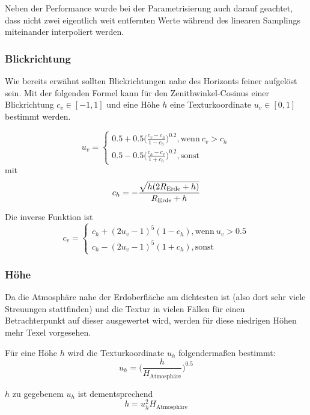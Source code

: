 Neben der Performance wurde bei der Parametrisierung auch darauf geachtet, dass nicht zwei eigentlich weit entfernten
Werte während des linearen Samplings miteinander interpoliert werden.

\subsubsection{Blickrichtung}
Wie bereits erwähnt sollten Blickrichtungen nahe des Horizonts feiner aufgelöst sein. Mit der folgenden Formel kann für
den Zenithwinkel-Cosinus einer Blickrichtung $c_v \in [-1, 1]$ und eine Höhe $h$ eine Texturkoordinate $u_v \in [0,1]$
bestimmt werden.

\begin{equation*}
	u_v = \begin{cases}
		0.5 + 0.5 \Big(\frac{c_v-c_h}{1-c_h}\Big)^{0.2}, \text{wenn}\  c_v > c_h \\
		0.5 - 0.5 \Big(\frac{c_h-c_v}{1+c_h}\Big)^{0.2}, \text{sonst}
	\end{cases}
\end{equation*}
mit
\begin{equation*}
	c_h = -\frac{\sqrt{h(2R_{\text{Erde}}+h)}}{R_{\text{Erde}}+h}\\
\end{equation*}

Die inverse Funktion ist
\begin{equation*}
	c_v = \begin{cases}
		c_h+(2u_v-1)^5(1-c_h), \text{wenn}\  u_v > 0.5 \\
		c_h-(2u_v-1)^5(1+c_h), \text{sonst}
	\end{cases}
\end{equation*}

\subsubsection{Höhe}
Da die Atmosphäre nahe der Erdoberfläche am dichtesten ist (also dort sehr viele Streuungen stattfinden) und die Textur
in vielen Fällen für einen Betrachterpunkt auf dieser ausgewertet wird, werden für diese niedrigen Höhen mehr Texel
vorgesehen.

Für eine Höhe $h$ wird die Texturkoordinate $u_h$ folgendermaßen bestimmt:
\begin{equation*}
	u_h = \Big(\frac{h}{H_{\text{Atmosphäre}}}\Big)^{0.5}
\end{equation*}

$h$ zu gegebenem $u_h$ ist dementsprechend
\begin{equation*}
	h = u_h^2H_{\text{Atmosphäre}}
\end{equation*}

